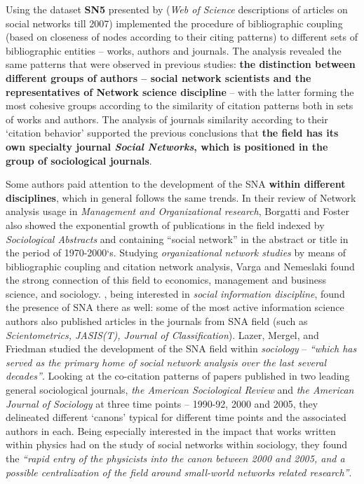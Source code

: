 \documentclass[11pt]{article} %
\begin{document}
Using the dataset \textbf{SN5} \citep{sn5} presented by \citeyearpar{Understand} (\textit{Web of Science} descriptions of articles on social networks till 2007) \cite{brandes} implemented the procedure of bibliographic coupling (based on closeness of nodes according to their citing patterns) to different sets of bibliographic entities -- works, authors and journals. The analysis revealed the same patterns that were observed in previous studies: \textbf{the distinction between different groups of authors -- social network scientists and the representatives of Network science discipline} -- with the latter forming the most cohesive groups according to the similarity of citation patterns both in sets of works and authors. The analysis of journals similarity according to their `citation behavior' supported the previous conclusions \citep{normSci, leydes} that \textbf{the field has its own specialty journal \textit{Social Networks}, which is positioned in the group of sociological journals}.\medskip  

Some authors paid attention to the development of the SNA \textbf{within different disciplines}, which in general follows the same trends. In their review of Network analysis usage in \textit{Management and Organizational research}, Borgatti and Foster \citeyearpar{borgatti} also showed the exponential growth of publications in the field indexed by \textit{Sociological Abstracts} and containing “social network” in the abstract or title in the period of 1970-2000`s. Studying \textit{organizational network studies} by means of bibliographic coupling and citation network analysis, Varga and Nemeslaki \citeyearpar{varga} found the strong connection of this field to economics, management and business science, and sociology. \cite{SNAinf}, being interested in \textit{social information discipline}, found the presence of SNA there as well: some of the most active information science authors also published articles in the journals from SNA field (such as \textit{Scientometrics, JASIS(T), Journal of Classification}). Lazer, Mergel, and Friedman \citeyearpar{lazer} studied the development of the SNA field within \textit{sociology} -- \textit{``which has served as the primary home of social network analysis over the last several decades''}. Looking at the co-citation patterns of papers published in two leading general sociological journals, \textit{the American Sociological Review} and \textit{the American Journal of Sociology} at three time points -- 1990-92, 2000 and 2005, they delineated different `canons' typical for different time points and the associated authors in each. Being especially interested in the impact that works written within physics had on the study of social networks within sociology, they found the \textit{``rapid entry of the physicists into the canon between 2000 and 2005, and a possible centralization of the field around small-world networks related research''}.\medskip  
\end{document}
